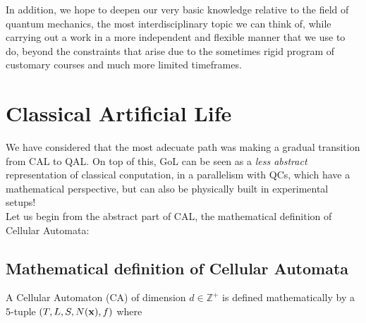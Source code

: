 \documentclass[11pt]{article}
\numberwithin{equation}{section} %
\numberwithin{figure}{section} %
\begin{document}
In addition, we hope to deepen our very basic knowledge relative to the field of quantum mechanics, the most interdisciplinary topic we can think of, while carrying out a work in a more independent and flexible manner that we use to do, beyond the constraints that arise due to the sometimes rigid program of customary courses and much more limited timeframes. 


\newpage
\section{Classical Artificial Life}

We have considered that the most adecuate path was making a gradual transition from CAL to QAL. On top of this, GoL can be seen as a \emph{less abstract} representation of classical conputation, in a parallelism with QCs, which have a mathematical perspective, but can also be physically built in experimental setups!\\

Let us begin from the abstract part of CAL, the mathematical definition of Cellular Automata:

\subsection{Mathematical definition of Cellular Automata} \label{Mathematical definition CA}

A Cellular Automaton (CA) of dimension $d\in\mathbb{Z}^+$ is defined mathematically by a 5-tuple $(T, L,S,N({\bf x}),f)$ where
\end{document}

